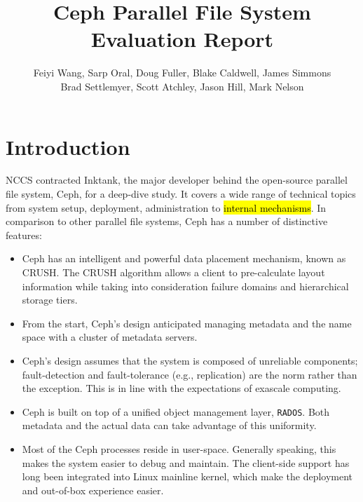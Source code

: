 \documentclass{article}
\title{Ceph Parallel File System Evaluation Report}
\author{Feiyi Wang, Sarp Oral, Doug Fuller, Blake Caldwell, James Simmons\\
Brad Settlemyer, Scott Atchley, Jason Hill, Mark Nelson}
\begin{document}


\pagebreak
\thispagestyle{empty}
\tableofcontents

\pagebreak
\thispagestyle{empty}
\listoffigures

\clearpage
{}


\section{Introduction}

NCCS contracted Inktank, the major developer behind the open-source parallel
file system, Ceph, for a deep-dive study. It covers a wide range of technical
topics from system setup, deployment, administration to \hl{internal mechanisms}. In
comparison to other parallel file systems, Ceph has a number of distinctive
features:

\begin{itemize}
  \item Ceph has an intelligent and powerful data placement mechanism, known as
  CRUSH. The CRUSH algorithm allows a client to pre-calculate layout
  information while taking into consideration failure domains and hierarchical storage tiers.
  
  \item From the start, Ceph's design anticipated managing metadata and the name space
  with a cluster of metadata servers.

\item Ceph's design assumes that the system is composed of
unreliable components; fault-detection and fault-tolerance (e.g., replication) are
the norm rather than the exception. This is in line with the expectations of
exascale computing.

\item Ceph is built on top of a unified object management layer,
\texttt{RADOS}. Both metadata and the actual data can take advantage of this
uniformity.

\item Most of the Ceph processes reside in user-space. Generally speaking, this makes the
system easier to debug and maintain. The client-side support has long been
integrated into Linux mainline kernel, which make the deployment and out-of-box
experience easier.

\end{itemize}
\end{document}
